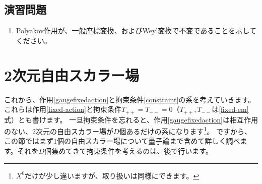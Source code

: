 \documentclass[report,paper=a4, fontsize=12pt, line_length=16cm, number_of_lines=33,dvipdfmx]{jlreq}
\numberwithin{equation}{chapter}
\numberwithin{equation}{section}
\begin{document}
\subsection*{演習問題}
\begin{enumerate}
\item Polyakov作用が、一般座標変換、およびWeyl変換で不変であることを示してください。
\end{enumerate}

\section{2次元自由スカラー場}
これから、作用\eqref{gaugefixedaction}と拘束条件\eqref{constraint}の系を考えていきます。
これらは作用\eqref{fixed-action}と拘束条件$T_{++}=T_{--}=0$（$T_{++},T_{--}$は\eqref{fixed-em}式）とも書けます。
一旦拘束条件を忘れると、作用\eqref{gaugefixedaction}は相互作用のない、2次元の自由スカラー場が$D$個あるだけの系になります\footnote{$X^0$だけが少し違いますが、取り扱いは同様にできます。}。
ですから、この節ではまず1個の自由スカラー場について量子論まで含めて詳しく調べます。それを$D$個集めてきて拘束条件を考えるのは、後で行います。
\end{document}
